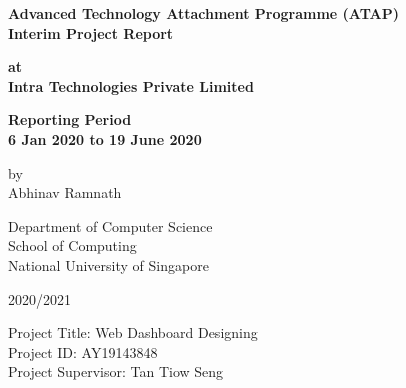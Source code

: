 \begin{titlepage}
	\begin{center}
		\vspace*{20px}
		\large\textbf{Advanced Technology Attachment Programme (ATAP)}\\
		\large\textbf{Interim Project Report}
		
		\vspace*{50px}
		\large\textbf{at}\\
		\large\textbf{Intra Technologies Private Limited}
		
		\vspace*{20px}
		\large\textbf{Reporting Period}\\
		\large\textbf{6 Jan 2020 to 19 June 2020}
		
		\vspace*{20px}
		\large{by}\\
		\large{Abhinav Ramnath}
		
		\vspace*{20px}
		\large{Department of Computer Science}\\
		\large{School of Computing}\\
		\large{National University of Singapore}
		
		\vspace*{20px}
		\large{2020/2021}
	\end{center}

	\begin{large}
		\vspace*{50px}
		\noindent 
		Project Title: Web Dashboard Designing\\
		Project ID: AY19143848\\
		Project Supervisor: Tan Tiow Seng\\
	\end{large}
\end{titlepage}